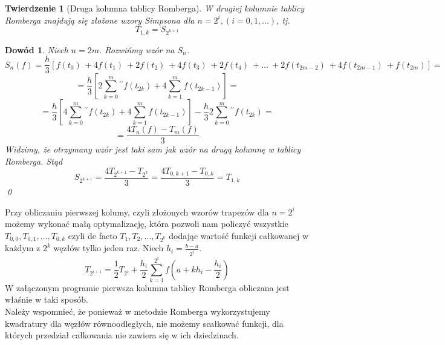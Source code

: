 \documentclass{article}
\newtheorem{twr}{Twierdzenie}
\newtheorem*{dd}{Dowód}
\begin{document}
\begin{twr}[Druga kolumna tablicy Romberga]
	W drugiej kolumnie tablicy Romberga znajdują się złożone wzory Simpsona dla $n = 2^i, (i = 0, 1, \ldots)$, tj.
	\begin{equation*}
		T_{1, k} = S_{2^{k+1}}
	\end{equation*}
\end{twr}
\begin{dd}
	\normalfont
	Niech $n = 2m$. Rozwińmy wzór na $S_n$.
	\begin{equation*}
		S_n(f) = \frac{h}{3}[f(t_0)\ + 4 f(t_1)\ + 2f(t_2)\ + 4f(t_3)\ + 2f(t_4)\ + \ldots\ + 2f(t_{2m - 2})\ + 4f(t_{2m - 1})\ + f(t_{2m})] =
	\end{equation*}
	\begin{equation*}
		= \frac{h}{3}[2 \sum_{k = 0}^m {}^{\prime\prime} f(t_{2k}) + 4 \sum_{k = 1}^m f(t_{2k - 1})] =
	\end{equation*}
	\begin{equation*}
		= \frac{h}{3}[4 \sum_{k = 0}^m {}^{\prime\prime} f(t_{2k}) + 4 \sum_{k = 1}^m f(t_{2k - 1})] - \frac{h}{3} 2 \sum_{k = 0}^m {}^{\prime\prime} f(t_{2k}) =
	\end{equation*}
	\begin{equation*}
		= \frac{4 T_n(f) - T_m(f)}{3}
	\end{equation*}
	Widzimy, że otrzymany wzór jest taki sam jak wzór na drugą kolumnę w tablicy Romberga. Stąd
	\begin{equation*}
		S_{2^{k+1}} = \frac{4T_{2^{k+1}} - T_{2^k}}{3} = \frac{4T_{0,k+1} - T_{0,k}}{3} = T_{1,k}
	\end{equation*}
	\qed
\end{dd}

Przy obliczaniu pierwszej kolumy, czyli złożonych wzorów trapezów dla $n = 2^i$ możemy wykonać małą optymalizację,
która pozwoli nam policzyć wszystkie $T_{0,0}, T_{0,1}, \ldots, T_{0,k}$ czyli de facto $T_1, T_{2}, \ldots, T_{2^k}$
dodając wartość funkcji całkowanej w każdym z $2^k$ węzłów tylko jeden raz. Niech $h_i = \frac{b-a}{2^i}$.
\begin{equation*}
	T_{2^{i+1}} = \frac{1}{2} T_{2^i} + \frac{h_i}{2} \sum_{k = 1}^{2^i} f\left(a + k h_i - \frac{h_i}{2}\right)
\end{equation*}
W załączonym programie pierwsza kolumna tablicy Romberga obliczana jest właśnie w taki sposób.\\
Należy wspomnieć, że ponieważ w metodzie Romberga wykorzystujemy kwadratury dla węzłów równoodległych, nie możemy
scałkować funkcji, dla których przedział całkowania nie zawiera się w ich dziedzinach.
\end{document}
